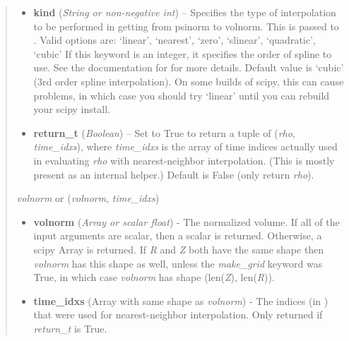 \documentclass[letterpaper,10pt,english]{sphinxmanual}
\begin{document}
\begin{fulllineitems}
\begin{fulllineitems}
\begin{quote}
\begin{description}
\begin{itemize}
\begin{quote}
\begin{tabulary}{\linewidth}{|L|L|}
`hand'
 & 
hands
\\

`default'
 & 
meters
\\
\hline\end{tabulary}

\end{quote}

If length\_unit is 1 or None, meters are assumed. The default
value is 1 (use meters).

\item {} 
\textbf{kind} (\emph{String or non-negative int}) --
Specifies the type of
interpolation to be performed in getting from psinorm to
volnorm. This is passed to
. Valid options are:
`linear', `nearest', `zero', `slinear', `quadratic', `cubic'
If this keyword is an integer, it specifies the order of spline
to use. See the documentation for  for more
details. Default value is `cubic' (3rd order spline
interpolation). On some builds of scipy, this can cause problems,
in which case you should try `linear' until you can rebuild your
scipy install.

\item {} 
\textbf{return\_t} (\emph{Boolean}) --
Set to True to return a tuple of (\emph{rho},
\emph{time\_idxs}), where \emph{time\_idxs} is the array of time indices
actually used in evaluating \emph{rho} with nearest-neighbor
interpolation. (This is mostly present as an internal helper.)
Default is False (only return \emph{rho}).

\end{itemize}

\item[{Returns}] \leavevmode

\emph{volnorm} or (\emph{volnorm}, \emph{time\_idxs})
\begin{itemize}
\item {} 
\textbf{volnorm} (\emph{Array or scalar float}) - The normalized volume.
If all of the input arguments are scalar, then a scalar is
returned. Otherwise, a scipy Array is returned. If \emph{R} and \emph{Z}
both have the same shape then \emph{volnorm} has this shape as well,
unless the \emph{make\_grid} keyword was True, in which case \emph{volnorm}
has shape (len(\emph{Z}), len(\emph{R})).

\item {} 
\textbf{time\_idxs} (Array with same shape as \emph{volnorm}) - The indices
(in ) that were used for
nearest-neighbor interpolation. Only returned if \emph{return\_t} is
True.


\end{itemize}
\end{description}
\end{quote}
\end{fulllineitems}
\end{fulllineitems}
\end{document}
